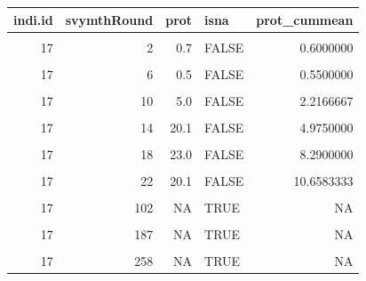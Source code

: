 \documentclass[
]{book}
\begin{document}
\begin{table}[!h]
\centering
\begin{tabular}{r|r|r|l|r}
\hline
indi.id & svymthRound & prot & isna & prot\_cummean\\
\hline
\cellcolor{gray!6}{17} & \cellcolor{gray!6}{0} & \cellcolor{gray!6}{0.5} & \cellcolor{gray!6}{FALSE} & \cellcolor{gray!6}{0.5000000}\\
\hline
17 & 2 & 0.7 & FALSE & 0.6000000\\
\hline
\cellcolor{gray!6}{17} & \cellcolor{gray!6}{4} & \cellcolor{gray!6}{0.5} & \cellcolor{gray!6}{FALSE} & \cellcolor{gray!6}{0.5666667}\\
\hline
17 & 6 & 0.5 & FALSE & 0.5500000\\
\hline
\cellcolor{gray!6}{17} & \cellcolor{gray!6}{8} & \cellcolor{gray!6}{6.1} & \cellcolor{gray!6}{FALSE} & \cellcolor{gray!6}{1.6600000}\\
\hline
17 & 10 & 5.0 & FALSE & 2.2166667\\
\hline
\cellcolor{gray!6}{17} & \cellcolor{gray!6}{12} & \cellcolor{gray!6}{6.4} & \cellcolor{gray!6}{FALSE} & \cellcolor{gray!6}{2.8142857}\\
\hline
17 & 14 & 20.1 & FALSE & 4.9750000\\
\hline
\cellcolor{gray!6}{17} & \cellcolor{gray!6}{16} & \cellcolor{gray!6}{20.1} & \cellcolor{gray!6}{FALSE} & \cellcolor{gray!6}{6.6555556}\\
\hline
17 & 18 & 23.0 & FALSE & 8.2900000\\
\hline
\cellcolor{gray!6}{17} & \cellcolor{gray!6}{20} & \cellcolor{gray!6}{24.9} & \cellcolor{gray!6}{FALSE} & \cellcolor{gray!6}{9.8000000}\\
\hline
17 & 22 & 20.1 & FALSE & 10.6583333\\
\hline
\cellcolor{gray!6}{17} & \cellcolor{gray!6}{24} & \cellcolor{gray!6}{10.1} & \cellcolor{gray!6}{FALSE} & \cellcolor{gray!6}{10.6153846}\\
\hline
17 & 102 & NA & TRUE & NA\\
\hline
\cellcolor{gray!6}{17} & \cellcolor{gray!6}{138} & \cellcolor{gray!6}{NA} & \cellcolor{gray!6}{TRUE} & \cellcolor{gray!6}{NA}\\
\hline
17 & 187 & NA & TRUE & NA\\
\hline
\cellcolor{gray!6}{17} & \cellcolor{gray!6}{224} & \cellcolor{gray!6}{NA} & \cellcolor{gray!6}{TRUE} & \cellcolor{gray!6}{NA}\\
\hline
17 & 258 & NA & TRUE & NA\\
\hline

\end{tabular}
\end{table}
\end{document}
